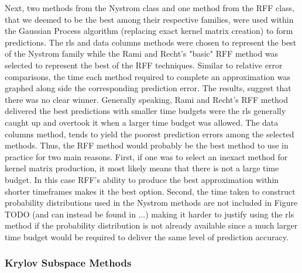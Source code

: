 Next, two methods from the Nystrom class and one method from the RFF class, that we deemed to be the best among their respective families, were used within the Gaussian Process algorithm (replacing exact kernel matrix creation) to form predictions. The rls and data columns methods were chosen to represent the best of the Nystrom family while the Rami and Recht's "basic" RFF method was selected to represent the best of the RFF techniques. Similar to relative error comparisons, the time each method required to complete an approximation was graphed along side the corresponding prediction error. The results, suggest that there was no clear winner. Generally speaking, Rami and Recht's RFF method delivered the best predictions with smaller time budgets were the rls generally caught up and overtook it when a larger time budget was allowed. The data columns method, tends to yield the poorest prediction errors among the selected methods. Thus, the RFF method would probably be the best method to use in practice for two main reasons. First, if one was to select an inexact method for kernel matrix production, it most likely means that there is not a large time budget. In this case RFF's ability to produce the best approximation within shorter timeframes makes it the best option. Second, the time taken to construct probability distributions used in the Nystrom methods are not included in Figure TODO (and can instead be found in ...) making it harder to justify using the rls method if the probability distribution is not already available since a much larger time budget would be required to deliver the same level of prediction accuracy.

\subsubsection{Krylov Subspace Methods}\label{Section5.3.2}

